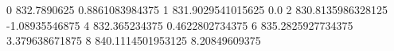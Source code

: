 0 832.7890625 0.8861083984375
1 831.9029541015625 0.0
2 830.8135986328125 -1.08935546875
4 832.365234375 0.4622802734375
6 835.2825927734375 3.379638671875
8 840.1114501953125 8.20849609375
